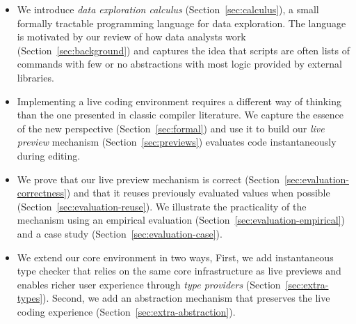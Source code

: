 \documentclass[acmsmall,anonymous,fleqn]{acmart}\settopmatter{printfolios=false,printccs=false,printacmref=false}
\theoremstyle{plain}
\theoremstyle{definition}
\begin{document}
\begin{itemize}[itemsep=3pt]
\item We introduce \emph{data exploration calculus} (Section~\ref{sec:calculus}), a small formally
  tractable programming language for data exploration. The language is motivated by our review
  of how data analysts work (Section~\ref{sec:background}) and captures the idea that scripts are
  often lists of commands with few or no abstractions with most logic provided by external libraries.

\item Implementing a live coding environment requires a different way of thinking than the one
  presented in classic compiler literature. We capture the essence of the new perspective
  (Section~\ref{sec:formal}) and use it to build our \emph{live preview} mechanism
  (Section~\ref{sec:previews}) evaluates code instantaneously during editing.

\item We prove that our live preview mechanism is correct (Section~\ref{sec:evaluation-correctness}) and that
  it reuses previously evaluated values when possible (Section~\ref{sec:evaluation-reuse}). We
  illustrate the practicality of the mechanism using an empirical evaluation
  (Section~\ref{sec:evaluation-empirical}) and a case study (Section~\ref{sec:evaluation-case}).

\item We extend our core environment in two ways, First, we add instantaneous type checker
  that relies on the same core infrastructure as live previews and enables richer user experience
  through \emph{type providers} (Section~\ref{sec:extra-types}). Second, we add an abstraction mechanism
  that preserves the live coding experience (Section~\ref{sec:extra-abstraction}).
\end{itemize}

\end{document}
